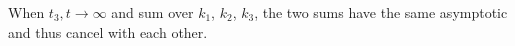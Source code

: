When $t_3, t\rightarrow \infty$ and sum over $k_1$, $k_2$, $k_3$, the two sums have the same asymptotic and thus cancel with each other.







